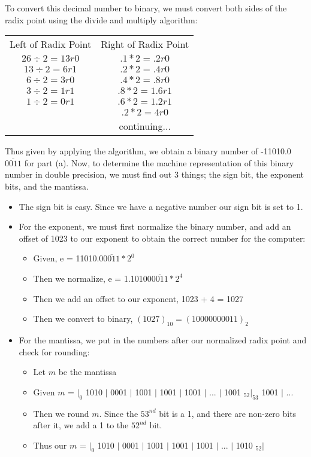 \documentclass[12pt]{article}
\begin{document}
\begin{enumerate}
	To convert this decimal number to binary, we must convert both sides of the radix point using the divide and multiply algorithm:
	
	\begin{center}
	\begin{tabular}{ c c }
	Left of Radix Point   & Right of Radix Point  \\
	$26\div2 = 13r0$ & $.1 * 2 = .2 r0$  \\ 
 	$13\div2 = 6r1$  & $.2 * 2 = .4 r0$  \\  
 	$6\div2 = 3r0$   & $.4 * 2 = .8 r0$  \\
 	$3\div2 = 1r1$   & $.8 * 2 = 1.6 r1$ \\
 	$1\div2 = 0r1$   & $.6 * 2 = 1.2 r1$ \\
 					 & $.2 * 2 = 4 r0$ \\
 	 				 & continuing... \\
 					 
	\end{tabular}
	\end{center}

Thus given by applying the algorithm, we obtain a binary number of -11010.0$\overline{0011}$ for part (a). Now, to determine the machine representation of this binary number in double precision, we must find out 3 things; the sign bit, the exponent bits, and the mantissa. 

	\begin{itemize}
		\item The sign bit is easy. Since we have a negative number our sign bit is set to 1.
		\item For the exponent, we must first normalize the binary number, and add an offset of 1023 to our exponent to obtain the correct number for the computer:
			\begin{itemize}
				\item[] Given, e = 11010.0$\overline{0011} * 2^0$
				\item[] Then we normalize, e = 1.10100$\overline{0011} * 2^4$
				\item[] Then we add an offset to our exponent, 1023 + 4 = 1027 
				\item[] Then we convert to binary, $(1027)_{10} = (10000000011)_2$
			\end{itemize}
		
		\item For the mantissa, we put in the numbers after our normalized radix point and check for rounding:
			\begin{itemize}
				\item[] Let $m$ be the mantissa
				\item[] Given $m$ = $|_{0}$ 1010 $|$ 0001 $|$ 1001 $|$ 1001 $|$ 1001 $|$ ... $|$ 1001 $_{52}|_{53}$ 1001 $|$ ...
				\item[] Then we round $m$. Since the $53^{nd}$ bit is a 1, and there are non-zero bits after it, we add a 1 to the $52^{nd}$ bit.
				\item[] Thus our $m$ = $|_{0}$ 1010 $|$ 0001 $|$ 1001 $|$ 1001 $|$ 1001 $|$ ... $|$ 1010 $_{52}|$
			\end{itemize}
			

\end{itemize}
\end{enumerate}
\end{document}
